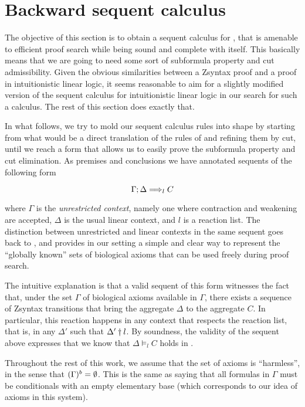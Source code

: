 \section{Backward sequent calculus}

The objective of this section is to obtain a sequent calculus for \eznd{}, that
is amenable to efficient proof search while being sound and complete with
\eznd{} itself. This basically means that we are going to need some sort of
subformula property and cut admissibility. Given the obvious similarities
between a Zsyntax proof and a proof in intuitionistic linear logic, it seems
reasonable to aim for a slightly modified version of the sequent calculus for
intuitionistic linear logic in our search for such a calculus. The rest of this
section does exactly that.

In what follows, we try to mold our sequent calculus rules into shape by
starting from what would be a direct translation of the rules of \eznd{} and
refining them by cut, until we reach a form that allows us to easily prove the
subformula property and cut elimination. As premises and conclusions we have
annotated sequents of the following form

\[
  \Gamma ; \Delta \Longrightarrow_{l} C
\]

where $\Gamma$ is the \emph{unrestricted context}, namely one where contraction
and weakening are accepted, $\Delta$ is the usual linear context, and $l$ is a
reaction list. The distinction between unrestricted and linear contexts in the
same sequent goes back to \cite{GIRARD1993201}, and provides in our setting a
simple and clear way to represent the ``globally known'' sets of biological
axioms that can be used freely during proof search.

The intuitive explanation is that a valid sequent of this form
witnesses the fact that, under the set $\Gamma$ of biological axioms available
in $\Gamma$, there exists a sequence of Zsyntax transitions that bring the
aggregate $\Delta$ to the aggregate $C$. In particular, this reaction happens in
any context that respects the reaction list, that is, in any $\Delta'$ such that
$\Delta' \dagger l$. By soundness, the validity of the sequent above
expresses that we know that $\Delta \models_{l} C$ holds in \eznd{}.

Throughout the rest of this work, we assume that the set of axioms is
``harmless'', in the sense that $(\Gamma)^{b} = \emptyset$.  This is the
same as saying that all formulas in $\Gamma$ must be conditionals with an empty
elementary base (which corresponds to our idea of axioms in this system).


